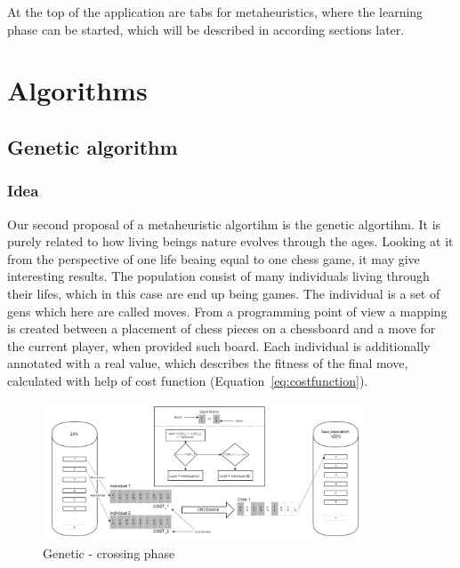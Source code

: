 \documentclass[pdftex]{article}
\begin{document}
At the top of the application are tabs for metaheuristics, where the learning phase can be started, which will be described in according sections later.

\section{Algorithms}
\label{sec:project}

\subsection{Genetic algorithm}
\label{sec:genetic}

\subsubsection{Idea}

Our second proposal of a metaheuristic algortihm is the genetic algortihm. It is purely related to how living beings nature evolves through the ages. Looking at it from the perspective of one life beaing equal to one chess game, it may give interesting results. The population consist of many individuals living through their lifes, which in this case are end up being games. The individual is a set of gens which here are called moves. From a programming point of view a mapping is created between a placement of chess pieces on a chessboard and a move for the current player, when provided such board. Each individual is additionally annotated with a real value, which describes the fitness of the final move, calculated with help of cost function (Equation~\ref{eq:costfunction}).

\begin{figure}[!htb]
	\centering
	\includegraphics[width=0.85\textwidth]{genetic/genetic_crossing.png}
	\caption{Genetic - crossing phase}
	\label{fig:genetic_crossing}
\end{figure}
\end{document}
